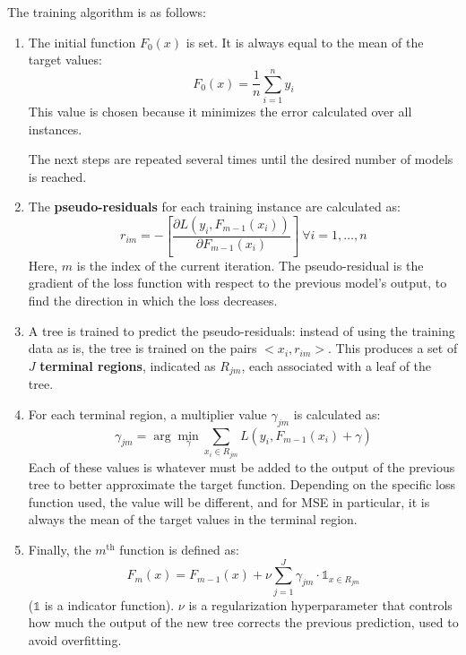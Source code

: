 The training algorithm is as follows:
\begin{enumerate}
    \item The initial function $F_0(x)$ is set. It is always equal to the mean of the target values:
    \begin{equation*}
        F_0(x) = \frac{1}{n} \sum_{i=1}^n y_i
    \end{equation*}
    This value is chosen because it minimizes the error calculated over all instances.

    The next steps are repeated several times until the desired number of models is reached.

    \item The \textbf{pseudo-residuals} for each training instance are calculated as:
    \begin{equation*}
        r_{im} = - \left [ \dfrac{\partial L(y_i, F_{m-1}(x_i))}{\partial F_{m-1}(x_i)} \right ] \ \forall i = 1, \dots, n
    \end{equation*}
    Here, $m$ is the index of the current iteration. The pseudo-residual is the gradient of the loss function with respect to the previous model's output, to find the direction in which the loss decreases.

    \item A tree is trained to predict the pseudo-residuals: instead of using the training data as is, the tree is trained on the pairs $<x_i, r_{im}>$. This produces a set of $J$ \textbf{terminal regions}, indicated as $R_{jm}$, each associated with a leaf of the tree.
    
    \item For each terminal region, a multiplier value $\gamma_{jm}$ is calculated as:
    \begin{equation*}
        \gamma_{jm} = \arg\min_{\gamma} \sum_{x_i \in R_{jm}} L(y_i, F_{m-1}(x_i) + \gamma)
    \end{equation*}
    Each of these values is whatever must be added to the output of the previous tree to better approximate the target function. Depending on the specific loss function used, the value will be different, and for MSE in particular, it is always the mean of the target values in the terminal region.

    \item Finally, the $m^{\text{th}}$ function is defined as:
    \begin{equation*}
        F_m(x) = F_{m-1}(x) + \nu \sum_{j=1}^J \gamma_{jm} \cdot \mathds{1}_{x \in R_{jm}}
    \end{equation*}
    ($\mathds{1}$ is a indicator function). $\nu$ is a regularization hyperparameter that controls how much the output of the new tree corrects the previous prediction, used to avoid overfitting.
\end{enumerate}

